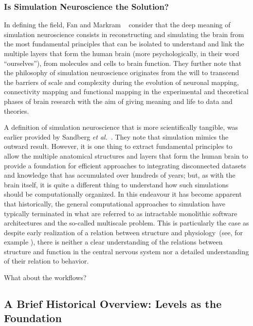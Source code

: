 \documentclass[10pt,letterpaper]{article}
\begin{document}
\subsubsection*{Is Simulation Neuroscience the Solution?}
\label{subsection:simneuro}

In defining the field, Fan and Markram ~\cite{fan19} consider that the deep meaning of simulation neuroscience consists in reconstructing and simulating the brain from the most fundamental principles that can be isolated to understand and link the multiple layers that form the human brain (more psychologically, in their word ``ourselves''), from molecules and cells to brain function. They further note that the philosophy of simulation neuroscience originates from the will to transcend the barriers of scale and complexity during the evolution of neuronal mapping, connectivity mapping and functional mapping in the experimental and theoretical phases of brain research with the aim of giving meaning and life to data and theories.

A definition of simulation neuroscience that is more scientifically tangible, was earlier provided by Sandberg {\it{et al}.}~\cite{sandberg08}. They note that simulation mimics the outward result. However, it is one thing to extract fundamental principles to allow the multiple anatomical structures and layers that form the human brain to provide a foundation for efficient approaches to integrating disconnected datasets and knowledge that has accumulated over hundreds of years; but, as with the brain itself, it is quite a different thing to understand how such simulations should be computationally organized. In this endeavour it has become apparent that historically, the general computational approaches to simulation have typically terminated in what are referred to as intractable monolithic software architectures and the so-called multiscale problem.
This is particularly the case as despite early realization of a relation between structure and physiology~(see, for example \cite{sieck17}), there is neither a clear understanding of the relations between structure and function in the central nervous system nor a detailed understanding of their relation to behavior.

What about the workflows?

\subsection*{A Brief Historical Overview: Levels as the Foundation}
\end{document}
